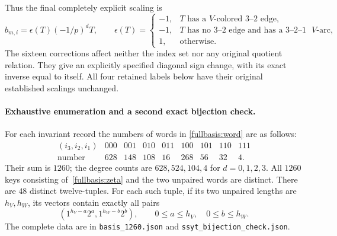 Thus the final completely explicit scaling is
\begin{equation}\label{fullbasis:sign}
 b_{m,i}=\epsilon(T)(-1/p)^d T,
 \qquad
 \epsilon(T)=
 \begin{cases}
 -1,&\text{$T$ has a $V$-colored $3$--$2$ edge},\\
 -1,&\text{$T$ has no $3$--$2$ edge and has a $3$--$2$--$1$ $V$-arc},\\
 1,&\text{otherwise}.
 \end{cases}
\end{equation}
The sixteen corrections affect neither the index set nor any original
quotient relation.  They give an explicitly specified diagonal sign
change, with its exact inverse equal to itself.  All four retained
labels below have their original established scalings unchanged.

\paragraph{Exhaustive enumeration and a second exact bijection check.}
For each invariant record the numbers of words in
\eqref{fullbasis:word} are as follows:
\[
\begin{array}{c|rrrrrrrr}
(i_3,i_2,i_1)&000&001&010&011&100&101&110&111\\\hline
\text{number}&628&148&108&16&268&56&32&4.
\end{array}
\]
Their sum is $1260$; the degree counts are $628,524,104,4$ for
$d=0,1,2,3$.  All $1260$ keys consisting of~\eqref{fullbasis:zeta}
and the two unpaired words are distinct.  There are $48$ distinct
twelve-tuples.  For each such tuple, if its two unpaired lengths are
$h_V,h_W$, its vectors contain exactly all pairs
\[
 (1^{h_V-a}2^a,1^{h_W-b}2^b),\qquad
 0\leq a\leq h_V,\quad0\leq b\leq h_W.
\]
The complete data are in \texttt{basis\_1260.json} and
\texttt{ssyt\_bijection\_check.json}.

